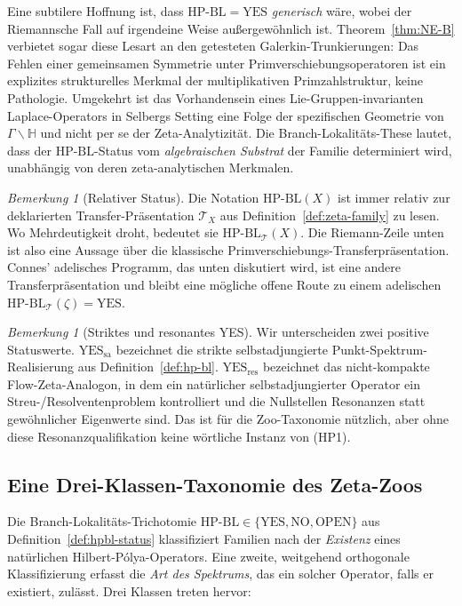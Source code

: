 \documentclass[11pt]{article}
\theoremstyle{definition}
\theoremstyle{remark}
\newtheorem{remark}[theorem]{Bemerkung}
\newcommand{\HBL}{\mathrm{HP\text{-}BL}}
\begin{document}
Eine subtilere Hoffnung ist, dass $\HBL = \mathrm{YES}$ \emph{generisch} wäre,
wobei der Riemannsche Fall auf irgendeine Weise außergewöhnlich ist. Theorem~\ref{thm:NE-B}
verbietet sogar diese Lesart an den getesteten Galerkin-Trunkierungen: Das
Fehlen einer gemeinsamen Symmetrie unter Primverschiebungsoperatoren ist ein explizites
strukturelles Merkmal der multiplikativen Primzahlstruktur, keine Pathologie. Umgekehrt
ist das Vorhandensein eines Lie-Gruppen-invarianten Laplace-Operators in Selbergs
Setting eine Folge der spezifischen Geometrie von $\Gamma\backslash\mathbb{H}$ und
nicht per se der Zeta-Analytizität. Die Branch-Lokalitäts-These lautet, dass
der $\HBL$-Status vom \emph{algebraischen Substrat} der Familie determiniert wird,
unabhängig von deren zeta-analytischen Merkmalen.

\begin{remark}[Relativer Status]\label{rem:relative-hbl}
Die Notation $\HBL(X)$ ist immer relativ zur deklarierten
Transfer-Präsentation $\mathcal{T}_X$ aus Definition~\ref{def:zeta-family}
zu lesen. Wo Mehrdeutigkeit droht, bedeutet sie
$\HBL_{\mathcal{T}}(X)$. Die Riemann-Zeile unten ist also eine Aussage
über die klassische Primverschiebungs-Transferpräsentation. Connes'
adelisches Programm, das unten diskutiert wird, ist eine andere
Transferpräsentation und bleibt eine mögliche offene Route zu einem
adelischen $\HBL_{\mathcal{T}}(\zeta)=\mathrm{YES}$.
\end{remark}

\begin{remark}[Striktes und resonantes YES]\label{rem:yes-types}
Wir unterscheiden zwei positive Statuswerte. $\mathrm{YES}_{\mathrm{sa}}$
bezeichnet die strikte selbstadjungierte Punkt-Spektrum-Realisierung aus
Definition~\ref{def:hp-bl}. $\mathrm{YES}_{\mathrm{res}}$ bezeichnet das
nicht-kompakte Flow-Zeta-Analogon, in dem ein natürlicher selbstadjungierter
Operator ein Streu-/Resolventenproblem kontrolliert und die Nullstellen
Resonanzen statt gewöhnlicher Eigenwerte sind. Das ist für die Zoo-Taxonomie
nützlich, aber ohne diese Resonanzqualifikation keine wörtliche Instanz von
(HP1).
\end{remark}

\subsection{Eine Drei-Klassen-Taxonomie des Zeta-Zoos}
\label{sec:three-class-taxonomy}

Die Branch-Lokalitäts-Trichotomie $\HBL \in \{\mathrm{YES}, \mathrm{NO}, \mathrm{OPEN}\}$
aus Definition~\ref{def:hpbl-status} klassifiziert Familien nach der
\emph{Existenz} eines natürlichen Hilbert-P\'olya-Operators. Eine zweite,
weitgehend orthogonale Klassifizierung erfasst die \emph{Art des Spektrums}, das
ein solcher Operator, falls er existiert, zulässt. Drei Klassen treten hervor:
\end{document}
